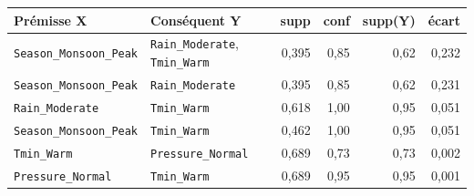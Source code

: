 \footnotesize
\begin{tabular}{>{\raggedright\arraybackslash}p{4.7cm}>{\raggedright\arraybackslash}p{4.4cm}rrrr}
\toprule
\rowcolor{NuitBleue!90}
\color{white}\textbf{Prémisse X} & \color{white}\textbf{Conséquent Y} & \color{white}\textbf{supp} & \color{white}\textbf{conf} & \color{white}\textbf{supp(Y)} & \color{white}\textbf{écart} \\
\midrule
\texttt{Season\_Monsoon\_Peak} & \texttt{Rain\_Moderate}, \texttt{Tmin\_Warm} & 0,395 & 0,85 & 0,62 & 0,232 \\
\texttt{Season\_Monsoon\_Peak} & \texttt{Rain\_Moderate} & 0,395 & 0,85 & 0,62 & 0,231 \\
\texttt{Rain\_Moderate} & \texttt{Tmin\_Warm} & 0,618 & 1,00 & 0,95 & 0,051 \\
\texttt{Season\_Monsoon\_Peak} & \texttt{Tmin\_Warm} & 0,462 & 1,00 & 0,95 & 0,051 \\
\texttt{Tmin\_Warm} & \texttt{Pressure\_Normal} & 0,689 & 0,73 & 0,73 & 0,002 \\
\texttt{Pressure\_Normal} & \texttt{Tmin\_Warm} & 0,689 & 0,95 & 0,95 & 0,001 \\
\bottomrule
\end{tabular}

